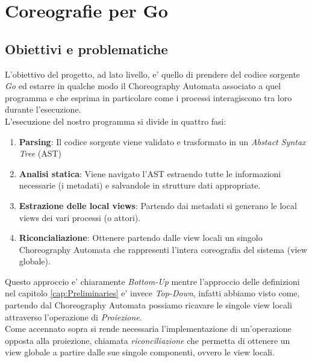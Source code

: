 \chapter{Coreografie per Go}
\section{Obiettivi e problematiche}
L'obiettivo del progetto, ad lato livello, e' quello di prendere del codice sorgente \emph{Go} ed estarre in qualche modo il Choreography Automata associato a quel programma e che esprima in particolare come i processi interagiscono tra loro durante l'esecuzione.\\
L'esecuzione del nostro programma si divide in quattro fasi:
\begin{enumerate}
    \item \textbf{Parsing}: Il codice sorgente viene validato e trasformato in un \emph{Abstact Syntax Tree} (AST)
    \item \textbf{Analisi statica}: Viene navigato l'AST estraendo tutte le informazioni necessarie (i metadati) e salvandole in strutture dati appropriate.
    \item \textbf{Estrazione delle local views}: Partendo dai metadati si generano le local views dei vari processi (o attori).
    \item \textbf{Riconcialiazione}: Ottenere partendo dalle view locali un singolo Choreography Automata che rappresenti l'intera coreografia del sistema (view globale).
\end{enumerate}
Questo approccio e' chiaramente \emph{Bottom-Up} mentre l'approccio delle definizioni nel capitolo \ref{cap:Preliminaries} e' invece \emph{Top-Down}, infatti abbiamo visto come, partendo dal Choreography Automata possiamo ricavare le singole view locali attraverso l'operazione di \emph{Proiezione}.\\
Come accennato sopra si rende necessaria l'implementazione di un'operazione opposta alla proiezione, chiamata \emph{riconciliazione} che permetta di ottenere un view globale a partire dalle sue singole componenti, ovvero le view locali.

